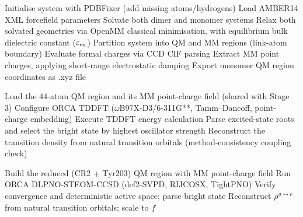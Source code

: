\documentclass[journal=jpcbfk, manuscript=article, layout=twocolumn, doi=true]{achemso}
\begin{document}



\begin{algorithm*}[ht]
\caption{Quantum-Classical Hybrid Excitonic Coupling Pipeline \\(\texttt{reproduce\_paper.py})}
\label{alg:pipeline}
\footnotesize
\begin{algorithmic}[1]
    \State {}
    \State {}      
    \State {}      
              
        \State {} 
    \EndIf
    \State {}         
\EndProcedure

\vspace{0.2cm}
    \State Initialise system with PDBFixer (add missing atoms/hydrogens)
    \State Load AMBER14 XML forcefield parameters
    \State Solvate both dimer and monomer systems
    \State Relax both solvated geometries via OpenMM classical minimisation, with equilibrium bulk dielectric constant ($\varepsilon_{\rm eq}$)
    \State Partition system into QM and MM regions (link-atom boundary)
    \State Evaluate formal charges via CCD CIF parsing
    \State Extract MM point charges, applying short-range electrostatic damping
    \State Export monomer QM region coordinates as .xyz file
\EndProcedure

\vspace{0.2cm}
    \State Load the $44$-atom QM region and its MM point-charge field (shared with Stage 3)
    \State Configure ORCA TDDFT ($\omega$B97X-D3/6-311G**, Tamm--Dancoff, point-charge embedding)
    \State Execute TDDFT energy calculation
    \State Parse excited-state roots and select the bright state by highest oscillator strength
    \State Reconstruct the transition density from natural transition orbitals (method-consistency coupling check)
\EndProcedure

\vspace{0.2cm}
    \State Build the reduced (CR2 + Tyr203) QM region with MM point-charge field
    \State Run ORCA DLPNO-STEOM-CCSD (def2-SVPD, RIJCOSX, TightPNO)
    \State Verify convergence and deterministic active space; parse bright state
    \State Reconstruct $\rho^{g\to e}$ from natural transition orbitals; scale to $f$
\EndProcedure


\end{algorithmic}
\end{algorithm*}
\end{document}

